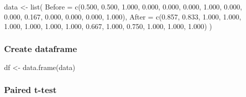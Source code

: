 \documentclass[
]{article}
\newenvironment{Shaded}{\begin{snugshade}}{\end{snugshade}}
\newcommand{\AttributeTok}[1]{\textcolor[rgb]{0.77,0.63,0.00}{#1}}
\newcommand{\ConstantTok}[1]{\textcolor[rgb]{0.00,0.00,0.00}{#1}}
\newcommand{\FloatTok}[1]{\textcolor[rgb]{0.00,0.00,0.81}{#1}}
\newcommand{\FunctionTok}[1]{\textcolor[rgb]{0.00,0.00,0.00}{#1}}
\newcommand{\NormalTok}[1]{#1}
\newcommand{\OtherTok}[1]{\textcolor[rgb]{0.56,0.35,0.01}{#1}}
\newcommand{\SpecialCharTok}[1]{\textcolor[rgb]{0.00,0.00,0.00}{#1}}
\newcommand{\StringTok}[1]{\textcolor[rgb]{0.31,0.60,0.02}{#1}}
\begin{document}
\begin{Shaded}
\begin{Highlighting}[]
\NormalTok{data }\OtherTok{\textless{}{-}} \FunctionTok{list}\NormalTok{(}
  \AttributeTok{Before =} \FunctionTok{c}\NormalTok{(}\FloatTok{0.500}\NormalTok{, }\FloatTok{0.500}\NormalTok{, }\FloatTok{1.000}\NormalTok{, }\FloatTok{0.000}\NormalTok{, }\FloatTok{0.000}\NormalTok{, }\FloatTok{0.000}\NormalTok{, }\FloatTok{1.000}\NormalTok{, }\FloatTok{0.000}\NormalTok{, }\FloatTok{0.000}\NormalTok{, }\FloatTok{0.167}\NormalTok{, }\FloatTok{0.000}\NormalTok{, }\FloatTok{0.000}\NormalTok{, }\FloatTok{0.000}\NormalTok{, }\FloatTok{1.000}\NormalTok{),}
  \AttributeTok{After =} \FunctionTok{c}\NormalTok{(}\FloatTok{0.857}\NormalTok{, }\FloatTok{0.833}\NormalTok{, }\FloatTok{1.000}\NormalTok{, }\FloatTok{1.000}\NormalTok{, }\FloatTok{1.000}\NormalTok{, }\FloatTok{1.000}\NormalTok{, }\FloatTok{1.000}\NormalTok{, }\FloatTok{1.000}\NormalTok{, }\FloatTok{0.667}\NormalTok{, }\FloatTok{1.000}\NormalTok{, }\FloatTok{0.750}\NormalTok{, }\FloatTok{1.000}\NormalTok{, }\FloatTok{1.000}\NormalTok{, }\FloatTok{1.000}\NormalTok{)}
\NormalTok{)}
\end{Highlighting}
\end{Shaded}

\hypertarget{create-dataframe}{%
\subsubsection{Create dataframe}\label{create-dataframe}}

\begin{Shaded}
\begin{Highlighting}[]
\NormalTok{df }\OtherTok{\textless{}{-}} \FunctionTok{data.frame}\NormalTok{(data)}
\end{Highlighting}
\end{Shaded}

\hypertarget{paired-t-test}{%
\subsubsection{Paired t-test}\label{paired-t-test}}

\begin{Shaded}
\end{Shaded}
\end{document}
